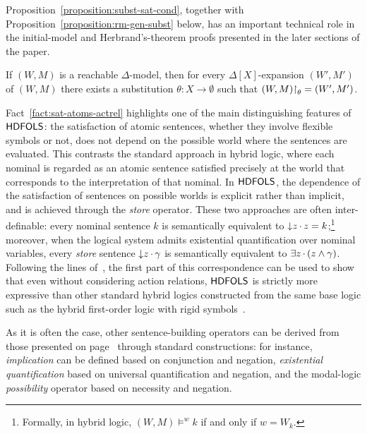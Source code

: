 \documentclass[a4paper,UKenglish,cleveref,autoref]{lipics-v2019}
\begin{document}
Proposition~\ref{proposition:subst-sat-cond}, together with Proposition~\ref{proposition:rm-gen-subst} below, has an important technical role in the initial-model and Herbrand's-theorem proofs presented in the later sections of the paper.

\begin{proposition} 
  \label{proposition:rm-gen-subst}
  If \((W, M)\) is a reachable \(\Delta\)-model, then for every \(\Delta[X]\)-expansion \((W', M')\) of \((W, M)\) there exists a substitution \(\theta \colon X \to \emptyset\) such that \((W, M) \mathord{\upharpoonright}_{\theta} = (W', M')\).
  \pushQED{\qed}\qedhere
\end{proposition}

Fact~\ref{fact:sat-atoms-actrel} highlights one of the main distinguishing features of \({\mathsf{HDFOLS}}\):
the satisfaction of atomic sentences, whether they involve flexible symbols or not, does not depend on the possible world where the sentences are evaluated.
This contrasts the standard approach in hybrid logic, where each nominal is regarded as an atomic sentence satisfied precisely at the world that corresponds to the interpretation of that nominal.
In \({\mathsf{HDFOLS}}\), the dependence of the satisfaction of sentences on possible worlds is explicit rather than implicit, and is achieved through the \emph{store} operator.
These two approaches are often inter-definable:
every nominal sentence \(k\) is semantically equivalent to \({\downarrow}z\,{\cdot}\, z = k\);\footnote{Formally, in hybrid logic, \((W, M) \models^{w} k\) if and only if \(w = W_{k}\).}
moreover, when the logical system admits existential quantification over nominal variables, every \emph{store} sentence \({\downarrow}z\,{\cdot}\, \gamma\) is semantically equivalent to \(\exists z\,{\cdot}\, (z \land \gamma)\).
Following the lines of~\cite[Section~4.3]{Gaina17Her}, the first part of this correspondence can be used to show that even without considering action relations, \({\mathsf{HDFOLS}}\) is strictly more expressive than other standard hybrid logics constructed from the same base logic such as the hybrid first-order logic with rigid symbols~\cite{DiaconescuM16,Diaconescu16}.

As it is often the case, other sentence-building operators can be derived from those presented on page~\pageref{sentence-building-operators} through standard constructions: for instance, \emph{implication} can be defined based on conjunction and negation, \emph{existential quantification} based on universal quantification and negation, and the modal-logic \emph{possibility} operator based on necessity and negation.
\end{document}
